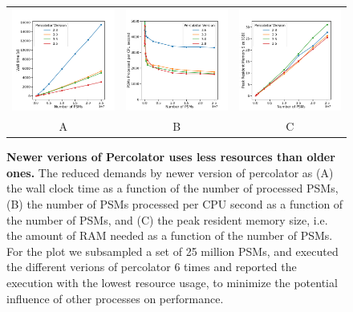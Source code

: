\documentclass{article}
\begin{document}


\begin{figure}
  \begin{center}
    \begin{tabular}{ccc}
    \includegraphics[width=0.3\linewidth]{img/wall.png} &
    \includegraphics[width=0.3\linewidth]{img/rate.png} &
    \includegraphics[width=0.3\linewidth]{img/memory.png} \\
    A & B & C \\
    \end{tabular}
    \caption{\textbf{Newer verions of Percolator uses less resources than older ones.} 
      The reduced demands by newer version of percolator as (A) the wall clock time as a function of the number of processed PSMs,
      (B) the number of PSMs processed per CPU second as a function of the number of PSMs, and
      (C) the peak resident memory size, i.e. the amount of RAM needed as a function of the number of PSMs. 
      For the plot we subsampled a set of 25 million PSMs, and executed the different verions of percolator 6 times and reported the execution with the lowest resource usage, to minimize the potential influence of other processes on performance.}
    \label{fig:performance}
  \end{center}
\end{figure}
\end{document}
